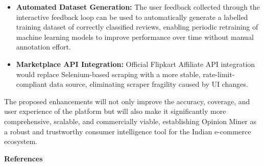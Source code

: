 \documentclass[12pt,a4paper]{report}
\begin{document}
\begin{itemize}
  \item \textbf{Automated Dataset Generation:} The user feedback collected through the interactive feedback loop can be used to automatically generate a labelled training dataset of correctly classified reviews, enabling periodic retraining of machine learning models to improve performance over time without manual annotation effort.

  \item \textbf{Marketplace API Integration:} Official Flipkart Affiliate API integration would replace Selenium-based scraping with a more stable, rate-limit-compliant data source, eliminating scraper fragility caused by UI changes.
\end{itemize}

The proposed enhancements will not only improve the accuracy, coverage, and user experience of the platform but will also make it significantly more comprehensive, scalable, and commercially viable, establishing Opinion Miner as a robust and trustworthy consumer intelligence tool for the Indian e-commerce ecosystem.

\newpage
\begin{center}
{\large\textbf{References}}
\end{center}
\end{document}
